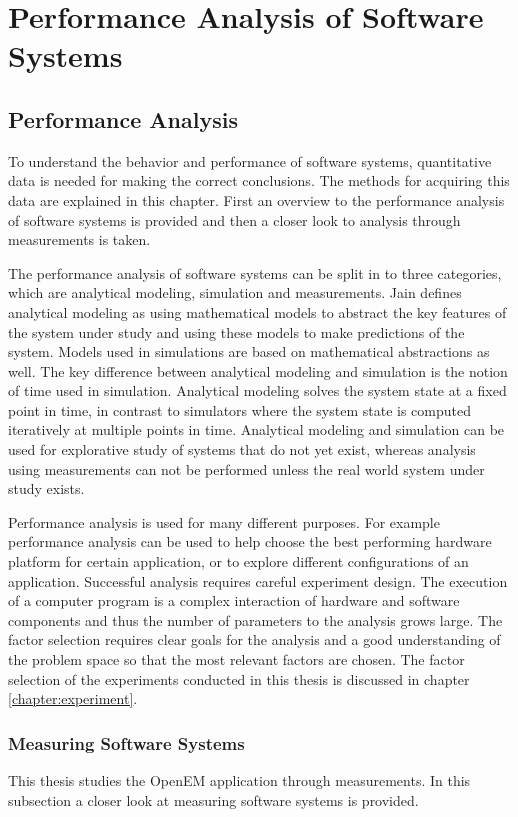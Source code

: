 \chapter{Performance Analysis of Software Systems}
\label{chapter:perfanalysis}
\section{Performance Analysis}
To understand the behavior and performance of software systems, quantitative
data is needed for making the correct conclusions. The methods for acquiring
this data are explained in this chapter. First an overview to the performance
analysis of software systems is provided and then a closer look to analysis
through measurements is taken.

The performance analysis of software systems can be split in to three
categories, which are analytical modeling, simulation and measurements. Jain
\cite{jain1991art} defines analytical modeling as using mathematical models to
abstract the key features of the system under study and using these models to
make predictions of the system. Models used in simulations are based on
mathematical abstractions as well. The key difference between analytical
modeling and simulation is the notion of time used in simulation. Analytical
modeling solves the system state at a fixed point in time, in contrast to
simulators where the system state is computed iteratively at multiple points in
time. Analytical modeling and simulation can be used for explorative study of
systems that do not yet exist, whereas analysis using measurements can not be
performed unless the real world system under study exists. \cite{jain1991art}

Performance analysis is used for many different purposes. For example
performance analysis can be used to help choose the best performing hardware
platform for certain application, or to explore different configurations of an
application. Successful analysis requires careful experiment design. The
execution of a computer program is a complex interaction of hardware and
software components and thus the number of parameters to the analysis grows
large. The factor selection requires clear goals for the analysis and a good
understanding of the problem space so that the most relevant factors are chosen.
The factor selection of the experiments conducted in this thesis is discussed in
chapter \ref{chapter:experiment}.

\subsection{Measuring Software Systems}
\label{subsec:measure}
This thesis studies the OpenEM application through measurements. In this
subsection a closer look at measuring software systems is provided.


